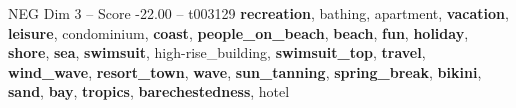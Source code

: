 \begin{textsample}{NEG Dim 3 – Score -22.00 – t003129}  \label{ex:f3_neg_014}
\textbf{recreation}, bathing, apartment, \textbf{vacation}, \textbf{leisure}, condominium, \textbf{coast}, \textbf{people\_on\_beach}, \textbf{beach}, \textbf{fun}, \textbf{holiday}, \textbf{shore}, \textbf{sea}, \textbf{swimsuit}, high-rise\_building, \textbf{swimsuit\_top}, \textbf{travel}, \textbf{wind\_wave}, \textbf{resort\_town}, \textbf{wave}, \textbf{sun\_tanning}, \textbf{spring\_break}, \textbf{bikini}, \textbf{sand}, \textbf{bay}, \textbf{tropics}, \textbf{barechestedness}, hotel

\end{textsample}
